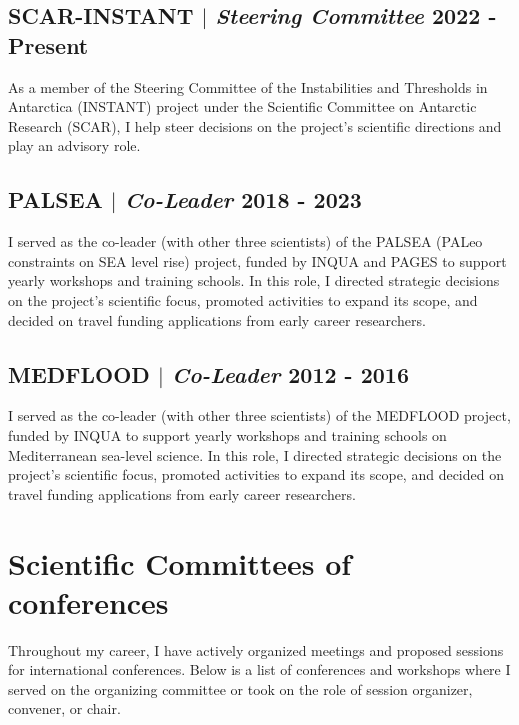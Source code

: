 \documentclass[11pt]{article}
\begin{document}
\subsection{SCAR-INSTANT  $|$ {\normalfont\textit{Steering Committee}} \hfill 2022 - Present}
{\footnotesize As a member of the Steering Committee of the Instabilities and Thresholds in Antarctica (INSTANT) project under the Scientific Committee on Antarctic Research (SCAR), I help steer decisions on the project's scientific directions and play an advisory role.}
\bigskip

\subsection{PALSEA  $|$ {\normalfont\textit{Co-Leader}} \hfill 2018 - 2023}
{\footnotesize I served as the co-leader (with other three scientists) of the PALSEA (PALeo constraints on SEA level rise) project, funded by INQUA and PAGES to support yearly workshops and training schools. In this role, I directed strategic decisions on the project's scientific focus, promoted activities to expand its scope, and decided on travel funding applications from early career researchers.}
\bigskip

\subsection{MEDFLOOD  $|$ {\normalfont\textit{Co-Leader}} \hfill 2012 - 2016}
{\footnotesize I served as the co-leader (with other three scientists) of the MEDFLOOD project, funded by INQUA to support yearly workshops and training schools on Mediterranean sea-level science. In this role, I directed strategic decisions on the project's scientific focus, promoted activities to expand its scope, and decided on travel funding applications from early career researchers.}
\bigskip

\section{Scientific Committees of conferences}
{\normalfont Throughout my career, I have actively organized meetings and proposed sessions for international conferences. Below is a list of conferences and workshops where I served on the organizing committee or took on the role of session organizer, convener, or chair.}\\
\end{document}
